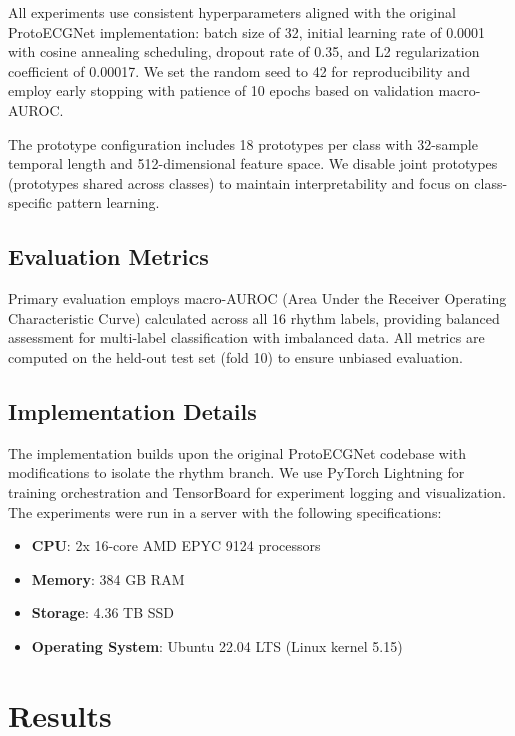 All experiments use consistent hyperparameters aligned with the original ProtoECGNet implementation: batch size of 32, initial learning rate of 0.0001 with cosine annealing scheduling, dropout rate of 0.35, and L2 regularization coefficient of 0.00017. We set the random seed to 42 for reproducibility and employ early stopping with patience of 10 epochs based on validation macro-AUROC.

The prototype configuration includes 18 prototypes per class with 32-sample temporal length and 512-dimensional feature space. We disable joint prototypes (prototypes shared across classes) to maintain interpretability and focus on class-specific pattern learning.

\subsection{Evaluation Metrics}

Primary evaluation employs macro-AUROC (Area Under the Receiver Operating Characteristic Curve) calculated across all 16 rhythm labels, providing balanced assessment for multi-label classification with imbalanced data. All metrics are computed on the held-out test set (fold 10) to ensure unbiased evaluation.

\subsection{Implementation Details}

The implementation builds upon the original ProtoECGNet codebase with modifications to isolate the rhythm branch. We use PyTorch Lightning for training orchestration and TensorBoard for experiment logging and visualization. The experiments were run in a server with the following specifications:

\begin{itemize}
    \item \textbf{CPU}: 2x 16-core AMD EPYC 9124 processors
    \item \textbf{Memory}: 384 GB RAM
    \item \textbf{Storage}: 4.36 TB SSD
    \item \textbf{Operating System}: Ubuntu 22.04 LTS (Linux kernel 5.15)
\end{itemize}

\section{Results}

